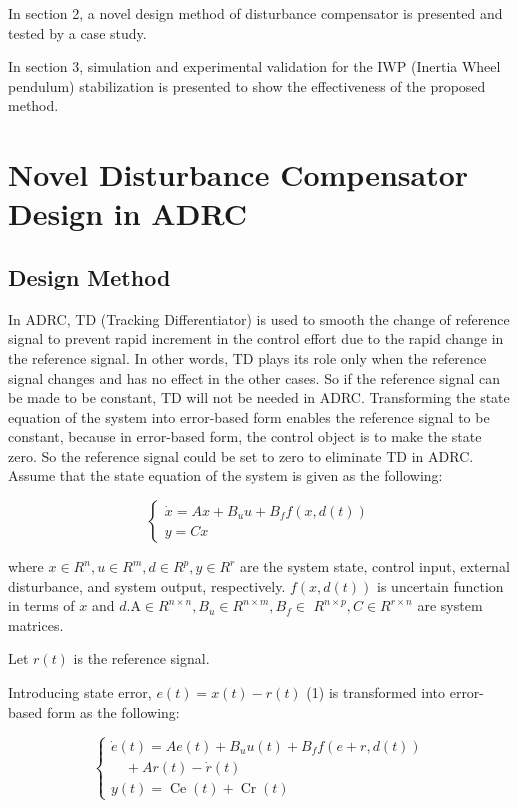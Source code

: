 \documentclass[10pt]{article}
\begin{document}
In section 2, a novel design method of disturbance compensator is presented and tested by a case study.

In section 3, simulation and experimental validation for the IWP (Inertia Wheel pendulum) stabilization is presented to show the effectiveness of the proposed method.

\section{Novel Disturbance Compensator Design in ADRC}
\subsection{Design Method}
In ADRC, TD (Tracking Differentiator) is used to smooth the change of reference signal to prevent rapid increment in the control effort due to the rapid change in the reference signal. In other words, TD plays its role only when the reference signal changes and has no effect in the other cases. So if the reference signal can be made to be constant, TD will not be needed in ADRC. Transforming the state equation of the system into error-based form enables the reference signal to be constant, because in error-based form, the control object is to make the state zero. So the reference signal could be set to zero to eliminate TD in ADRC.
Assume that the state equation of the system is given as the following:

$$
\left\{\begin{array}{l}
\dot{x}=A x+B_{u} u+B_{f} f(x, d(t)) \\
y=C x
\end{array}\right.
$$

where $x \in R^{n}, u \in R^{m}, d \in R^{p}, y \in R^{r}$ are the system state, control input, external disturbance, and system output, respectively. $f(x, d(t))$ is uncertain function in terms of $x$ and $d . \mathrm{A} \in R^{n \times n}, B_{u} \in R^{n \times m}, B_{f} \in$ $R^{n \times p}, C \in R^{r \times n}$ are system matrices.

Let $r(t)$ is the reference signal.

Introducing state error, $e(t)=x(t)-r(t)$ (1) is transformed into error-based form as the following:

$$
\left\{\begin{array}{c}
\dot{e}(t)=A e(t)+B_{u} u(t)+B_{f} f(e+r, d(t)) \\
\quad+A r(t)-\dot{r}(t) \\
y(t)=\operatorname{Ce}(t)+\operatorname{Cr}(t)
\end{array}\right.
$$
\end{document}
